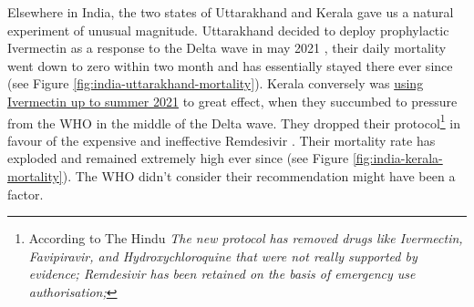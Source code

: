 \documentclass[11pt,a4paper,notitlepage]{report}
\begin{document}
Elsewhere in India, the two states of Uttarakhand and Kerala gave us a natural experiment of unusual magnitude. Uttarakhand decided to deploy prophylactic Ivermectin as a response to the Delta wave in may 2021 \cite{economictimes12052021}, their daily mortality went down to zero within two month and has essentially stayed there ever since (see Figure \ref{fig:india-uttarakhand-mortality}). Kerala conversely was \href{https://dhs.kerala.gov.in/wp-content/uploads/2021/04/Kerala-State-COVID-19-guidelines-Version-3.pdf}{using Ivermectin up to summer 2021} \cite{keralagov24042021} to great effect, when they succumbed to pressure from the WHO in the middle of the Delta wave. They dropped their protocol\footnote{According to The Hindu \cite{hindu06082021} \textit{The new protocol has removed drugs like Ivermectin, Favipiravir, and Hydroxychloroquine that were not really supported by evidence; Remdesivir has been retained on the basis of emergency use authorisation;}} in favour of the expensive and ineffective Remdesivir \cite{hindu06082021}. Their mortality rate has exploded and remained extremely high ever since (see Figure \ref{fig:india-kerala-mortality}). The WHO didn't consider their recommendation might have been a factor.   
\end{document}
